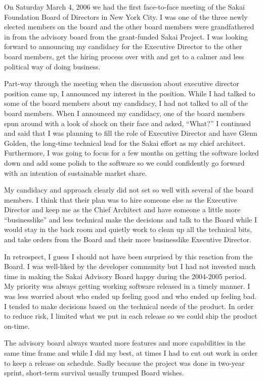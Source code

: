 \documentclass[12pt]{book}
\begin{document}
On Saturday March 4, 2006 we had the first face-to-face
meeting of the Sakai Foundation Board of Directors in
New York City.  I was one of the three newly elected members
on the board and the other board members
were grandfathered in from the advisory board from the
grant-funded Sakai Project.  I was looking
forward to announcing my candidacy for the Executive
Director to the other board members, get the hiring
process over with and get to a calmer and less political
way of doing business.

Part-way through the meeting when the discussion about
executive director position came up, I announced my
interest in the position.  While I had talked to
some of the board members about my candidacy, I had
not talked to all of the board members.  When I
announced my candidacy, one of the board members spun
around with a look of shock on their face and asked,
``What?''  I continued and said that I was planning to
fill the role of Executive Director and have Glenn
Golden, the long-time technical lead for the Sakai
effort as my chief architect.  Furthermore, I was going to focus
for a few months on getting the software locked down
and add some polish to the software so we could
confidently go forward with an intention of sustainable
market share.

My candidacy and approach clearly did not set so well
with several of the board members.  I think that their
plan was to hire someone else as the Executive Director
and keep me as the Chief Architect and have someone a
little more ``businesslike'' and less technical make the
decisions and talk to the Board while I would stay in
the back room and quietly work to clean up all the
technical bits, and take orders from the Board and
their more businesslike Executive Director.

In retrospect, I guess I should not have been surprised
by this reaction from the Board.  I was well-liked
by the developer community but I had not invested much
time in making the Sakai Advisory Board happy during
the 2004-2005 period.  My priority was always getting
working software released in a timely manner.
I was less worried about who ended up feeling good and
who ended up feeling bad.   I tended to make decisions
based on the technical needs of the product.  In order
to reduce risk, I limited what we put in each release
so we could ship the product on-time.

The advisory board always wanted more features and more
capabilities in the same time frame and while I did my
best, at times I had to cut out work in order to keep
a release on schedule.    Sadly because the project was
done in two-year sprint, short-term survival
usually trumped Board wishes.
\end{document}
